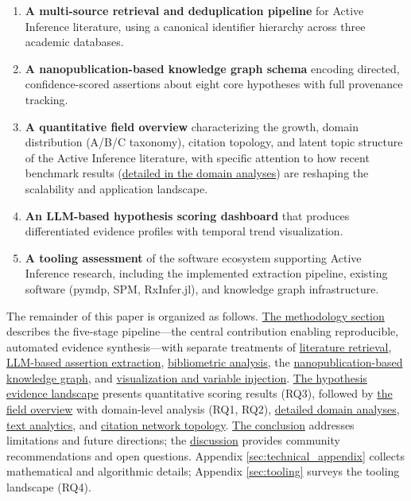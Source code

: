 \documentclass[
  english,
]{article}
\begin{document}
\begin{enumerate}
\def\labelenumi{\arabic{enumi}.}
\item
  \textbf{A multi-source retrieval and deduplication pipeline} for
  Active Inference literature, using a canonical identifier hierarchy
  across three academic databases.
\item
  \textbf{A nanopublication-based knowledge graph schema} encoding
  directed, confidence-scored assertions about eight core hypotheses
  with full provenance tracking.
\item
  \textbf{A quantitative field overview} characterizing the growth,
  domain distribution (A/B/C taxonomy), citation topology, and latent
  topic structure of the Active Inference literature, with specific
  attention to how recent benchmark results
  (\hyperref[sec:subfield_analyses]{detailed in the domain analyses})
  are reshaping the scalability and application landscape.
\item
  \textbf{An LLM-based hypothesis scoring dashboard} that produces
  differentiated evidence profiles with temporal trend visualization.
\item
  \textbf{A tooling assessment} of the software ecosystem supporting
  Active Inference research, including the implemented extraction
  pipeline, existing software (pymdp, SPM, RxInfer.jl), and knowledge
  graph infrastructure.
\end{enumerate}

The remainder of this paper is organized as follows.
\hyperref[sec:methods]{The methodology section} describes the five-stage
pipeline---the central contribution enabling reproducible, automated
evidence synthesis---with separate treatments of
\hyperref[sec:methods_retrieval]{literature retrieval},
\hyperref[sec:extraction_pipeline]{LLM-based assertion extraction},
\hyperref[sec:methods_bibliometrics]{bibliometric analysis}, the
\hyperref[sec:methods_kg]{nanopublication-based knowledge graph}, and
\hyperref[sec:methods_viz]{visualization and variable injection}.
\hyperref[sec:hypothesis_results]{The hypothesis evidence landscape}
presents quantitative scoring results (RQ3), followed by
\hyperref[sec:field_overview]{the field overview} with domain-level
analysis (RQ1, RQ2),
\hyperref[sec:subfield_analyses]{detailed domain analyses},
\hyperref[sec:text_analytics]{text analytics}, and
\hyperref[sec:citation_network]{citation network topology}.
\hyperref[sec:conclusion]{The conclusion} addresses limitations and
future directions; the \hyperref[sec:discussion]{discussion} provides
community recommendations and open questions. Appendix
\ref{sec:technical_appendix} collects mathematical and algorithmic
details; Appendix \ref{sec:tooling} surveys the tooling landscape (RQ4).
\end{document}
